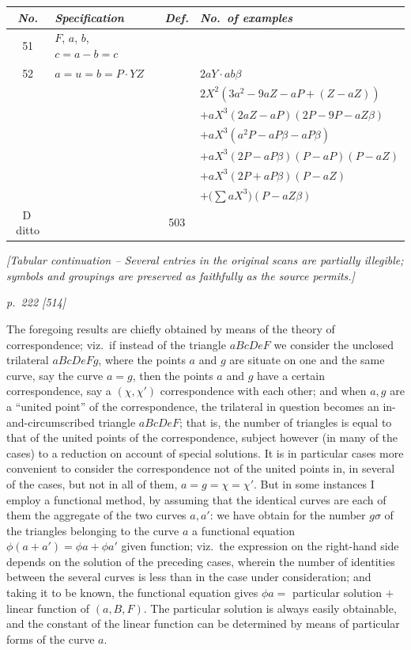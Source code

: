 \documentclass[11pt,a4paper]{book}
\begin{document}
\begin{center}
\renewcommand{\arraystretch}{1.25}
\begin{tabular}{|c|l|c|l|}
\hline
\textit{No.} & \textit{Specification} & \textit{Def.} & \textit{No.\ of examples} \\
\hline
51 & $F$, $a$, $b$, $c=a-b=c$ & & \\
\hline
52 & $a=u=b=P\cdot YZ$ & & $2aY\cdot ab\beta$ \\
\hline
& & & $2X^2 (3a^2-9aZ-aP+(Z-aZ))$ \\
& & & $+aX^3 (2aZ-aP)(2P-9P-aZ\beta)$ \\
& & & $+aX^3 (a^2 P-aP\beta-aP\beta)$ \\
& & & $+aX^3 (2P-aP\beta)(P-aP)(P-aZ)$ \\
& & & $+aX^3 (2P+aP\beta)(P-aZ)$ \\
& & & $+\bigl(\sum aX^3\bigr)(P-aZ\beta)$ \\
\hline
D\,ditto & & 503 & \\
\hline
\end{tabular}
\end{center}

\bigskip
\noindent\textit{[Tabular continuation -- Several entries in the original
scans are partially illegible; symbols and groupings are preserved as
faithfully as the source permits.]}

\clearpage

\bigskip
\textit{p.~222 [514]}
\smallskip

The foregoing results are chiefly obtained by means of the theory of correspondence;
viz.\ if instead of the triangle $aBcDeF$ we consider the unclosed trilateral $aBcDeFg$,
where the points $a$ and $g$ are situate on one and the same curve, say the curve
$a=g$, then the points $a$ and $g$ have a certain correspondence, say a $(\chi, \chi')$ correspondence with each other; and when $a, g$ are a ``united point'' of the correspondence,
the trilateral in question becomes an in-and-circumscribed triangle $aBcDeF$; that is,
the number of triangles is equal to that of the united points of the correspondence,
subject however (in many of the cases) to a reduction on account of special solutions.
It is in particular cases more convenient to consider the correspondence not of the united
points in, in several of the cases, but not in all of them, $a=g=\chi=\chi'$.  But in some
instances I employ a functional method, by assuming that the identical curves are each
of them the aggregate of the two curves $a, a'$: we have obtain for the number $g\sigma$
of the triangles belonging to the curve $a$ a functional equation $\phi(a+a')=\phi a+\phi a'$
given function; viz.\ the expression on the right-hand side depends on the solution of
the preceding cases, wherein the number of identities between the several curves is
less than in the case under consideration; and taking it to be known, the functional
equation gives $\phi a=$ particular solution $+$ linear function of $(a, B, F)$.  The particular
solution is always easily obtainable, and the constant of the linear function can be
determined by means of particular forms of the curve $a$.
\end{document}
